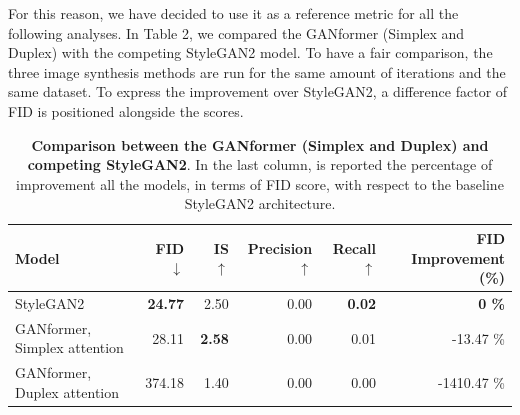 \documentclass{article}
\begin{document}
    For this reason, we have decided to use it as a reference metric for all the following analyses. In Table 2, we compared the GANformer (Simplex and Duplex) with the competing StyleGAN2 model. To have a fair comparison, the three image synthesis methods are run for the same amount of iterations and the same dataset. To express the improvement over StyleGAN2, a difference factor of FID is positioned alongside the scores. 
	\begin{table}[htb]
		\centering
		\caption{\textbf{Comparison between the GANformer (Simplex and Duplex) and competing 
				StyleGAN2}. In the last column, is reported the percentage of improvement all the models, in 
				terms 
			of FID score, with respect to the baseline StyleGAN2 architecture.}
		\label{tab:our-results}
		\vspace{3mm}
		\small
		\begin{tabular}{l|rrrrr}
			\toprule
			\textbf{Model}  & \textbf{FID $\downarrow$}  & \textbf{IS $\uparrow$} & 
			\textbf{Precision$\uparrow$}  & \textbf{Recall $\uparrow$} & \textbf{FID Improvement (\%)}\\ 
			\midrule
			StyleGAN2                    &  \textbf{24.77} & 2.50 & 0.00 & \textbf{0.02} & \textbf{0 \%} \\ 
			GANformer, Simplex attention & 28.11 & \textbf{2.58} & 0.00 & 0.01 & -13.47 \%\\ 
			GANformer, Duplex attention  & 374.18 & 1.40 & 0.00 & 0.00 & -1410.47 \% \\ 
			\bottomrule
		\end{tabular}
	\end{table}
	
\end{document}
